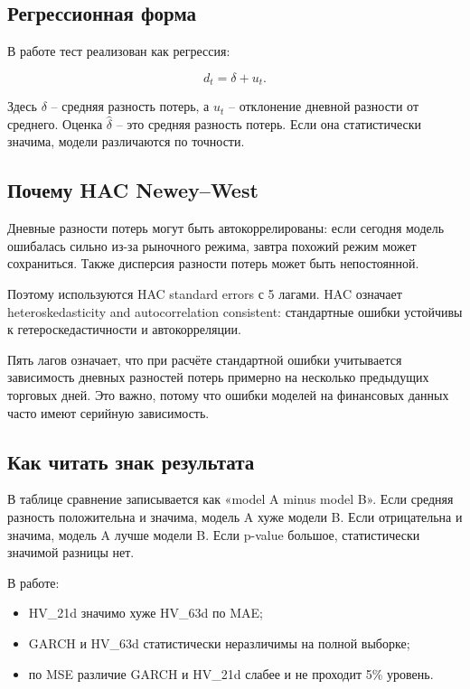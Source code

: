 \documentclass[11pt,a4paper]{article}
\begin{document}
\subsection{Регрессионная форма}

В работе тест реализован как регрессия:

\begin{equation}
d_t=\delta+u_t.
\end{equation}

Здесь $\delta$ -- средняя разность потерь, а $u_t$ -- отклонение дневной разности от среднего. Оценка $\hat{\delta}$ -- это средняя разность потерь. Если она статистически значима, модели различаются по точности.

\subsection{Почему HAC Newey--West}

Дневные разности потерь могут быть автокоррелированы: если сегодня модель ошибалась сильно из-за рыночного режима, завтра похожий режим может сохраниться. Также дисперсия разности потерь может быть непостоянной.

Поэтому используются HAC standard errors с 5 лагами. HAC означает heteroskedasticity and autocorrelation consistent: стандартные ошибки устойчивы к гетероскедастичности и автокорреляции.

Пять лагов означает, что при расчёте стандартной ошибки учитывается зависимость дневных разностей потерь примерно на несколько предыдущих торговых дней. Это важно, потому что ошибки моделей на финансовых данных часто имеют серийную зависимость.

\subsection{Как читать знак результата}

В таблице сравнение записывается как «model A minus model B». Если средняя разность положительна и значима, модель A хуже модели B. Если отрицательна и значима, модель A лучше модели B. Если p-value большое, статистически значимой разницы нет.

В работе:

\begin{itemize}
    \item HV\_21d значимо хуже HV\_63d по MAE;
    \item GARCH и HV\_63d статистически неразличимы на полной выборке;
    \item по MSE различие GARCH и HV\_21d слабее и не проходит 5\% уровень.
\end{itemize}
\end{document}
